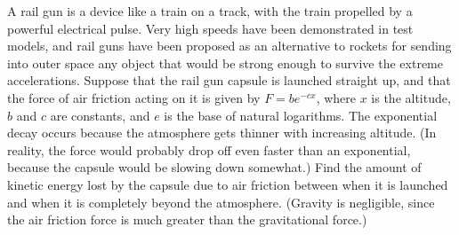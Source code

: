 A rail gun is a device like a train on a track, with
the train propelled by a powerful electrical pulse. Very
high speeds have been demonstrated in test models, and rail
guns have been proposed as an alternative to rockets for
sending into outer space any object that would be strong
enough to survive the extreme accelerations. Suppose that
the rail gun capsule is launched straight up, and that the
force of air friction acting on it is given by 
$F=be^{-cx}$, where $x$ is the altitude, $b$ and $c$ are
constants, and $e$ is the base of natural logarithms. The
exponential decay occurs because the atmosphere gets thinner
with increasing altitude. (In reality, the force would
probably drop off even faster than an exponential, because
the capsule would be slowing down somewhat.) Find the amount
of kinetic energy lost by the capsule due to air friction
between when it is launched and when it is completely beyond
the atmosphere. (Gravity is negligible, since the air
friction force is much greater than the gravitational force.)
\answercheck
